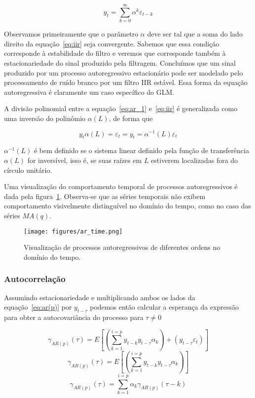 \begin{equation}\label{eq:iir}
    y_t = \sum^{\infty}_{k=0} \alpha^k \varepsilon_{t-k}
\end{equation}

Observamos primeiramente que o parâmetro $\alpha$ deve ser tal que a soma do
lado direito da equação~\ref{eq:iir} seja convergente. Sabemos que essa
condição corresponde à estabilidade do filtro e veremos que corresponde também
à estacionariedade do sinal produzido pela filtragem. Concluímos que um sinal
produzido por um processo autoregressivo estacionário pode ser modelado pelo
processamento de ruído branco por um filtro IIR estável. Essa forma da
equação autoregressiva é claramente um caso específico do GLM.

A divisão polinomial entre a equação~\ref{eq:ar_1} e~\ref{eq:iir} é generalizada
como uma inversão do polinômio $\alpha(L)$, de forma que

$$ y_t\alpha(L) = \varepsilon_t = y_t = \alpha^{-1}(L)\varepsilon_t$$

$\alpha^{-1}(L)$ é bem definido se o sistema linear definido pela função de
transferência $\alpha(L)$ for inversível, isso é, se suas raízes em $L$
estiverem localizadas fora do círculo unitário.

Uma visualização do comportamento temporal de processos autoregressivos é dada
pela figura~\ref{fig:ar_time_visualization}. Observa-se que as séries temporais
não exibem comportamento visivelmente distinguível no domínio do tempo, como
no caso das séries $MA(q)$.

\begin{figure}[H]
    \centering
    \texttt{[image: figures/ar\_time.png]}
    \caption{Visualização de processos autoregressivos de diferentes ordens
    no domínio do tempo.}
    \label{fig:ar_time_visualization}
\end{figure}

\subsubsection{Autocorrelação}

Assumindo estacionariedade e multiplicando ambos os lados da
equação~\ref{eq:ar(p)} por $y_{t-\tau}$ podemos então calcular a esperança da
expressão para obter a autocovariância do processo para $\tau \neq 0$

$$ \gamma_{AR(p)}(\tau) = E\left[\left(\sum^{i=p}_{k=1} y_{t-k}y_{t-\tau}\alpha_k\right) + (y_{t-\tau}\varepsilon_t)\right] $$
$$ \gamma_{AR(p)}(\tau) = E\left[\left(\sum^{i=p}_{k=1} y_{t-k}y_{t-\tau}\alpha_k\right)\right] $$
$$ \gamma_{AR(p)}(\tau) = \sum^{i=p}_{k=1} \alpha_k \gamma_{AR(p)}(\tau - k) $$

